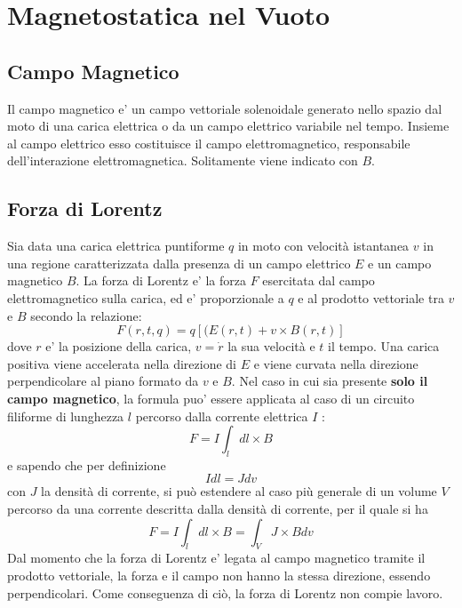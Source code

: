 \documentclass[a4paper, 10pt]{article}
\begin{document}
	\newpage
	\section{Magnetostatica nel Vuoto}
		\subsection{Campo Magnetico}
			Il campo magnetico e' un campo vettoriale solenoidale generato nello spazio dal moto di una carica elettrica o da un
			campo elettrico variabile nel tempo. Insieme al campo elettrico esso costituisce il campo elettromagnetico, 
			responsabile dell'interazione elettromagnetica. Solitamente viene indicato con $B$.
		\subsection{Forza di Lorentz}
			Sia data una carica elettrica puntiforme $q$ in moto con velocità istantanea $v$ in una regione caratterizzata
			dalla presenza di un campo elettrico $E$ e un campo magnetico $B$. La forza di Lorentz e' la forza $F$ esercitata
			dal campo elettromagnetico sulla carica, ed e' proporzionale a $q$ e al prodotto vettoriale tra $v$ e $B$ secondo la 
			relazione:
			\[ F(r,t,q) = q[(E(r,t) + v \times B(r,t)] \] dove $r$ e' la posizione della carica, 
			$v = \dot{r}$ la sua velocità e $t$ il tempo. Una carica positiva viene accelerata nella direzione di $E$ e viene 
			curvata nella direzione perpendicolare al piano formato da $v$ e $B$.
			Nel caso in cui sia presente \textbf{solo il campo magnetico}, la formula puo' essere applicata al caso di un 
			circuito filiforme di lunghezza $l$ percorso dalla corrente elettrica $I$ :
			\[ F = I \int_l dl \times B \] e sapendo che per definizione \[ I dl = J dv \] con $J$ la densità di corrente,
			si può estendere al caso più generale di un volume $V$ percorso da una corrente descritta dalla densità 
			di corrente, per il quale si ha 
			\[ F = I \int_l dl \times B = \int_V J \times B dv \]
			Dal momento che la forza di Lorentz e' legata al campo magnetico tramite il prodotto vettoriale, la forza e 
			il campo non hanno la stessa direzione, essendo perpendicolari. Come conseguenza di ciò, 
			la forza di Lorentz non compie lavoro.
\end{document}

